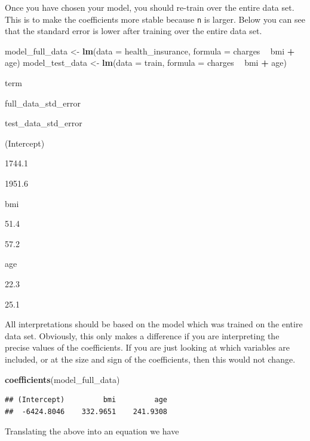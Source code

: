 \documentclass[]{book}
\newenvironment{Shaded}{\begin{snugshade}}{\end{snugshade}}
\newcommand{\DataTypeTok}[1]{\textcolor[rgb]{0.13,0.29,0.53}{#1}}
\newcommand{\KeywordTok}[1]{\textcolor[rgb]{0.13,0.29,0.53}{\textbf{#1}}}
\newcommand{\NormalTok}[1]{#1}
\newcommand{\OperatorTok}[1]{\textcolor[rgb]{0.81,0.36,0.00}{\textbf{#1}}}
\newcommand{\StringTok}[1]{\textcolor[rgb]{0.31,0.60,0.02}{#1}}
\begin{document}
Once you have chosen your model, you should re-train over the entire data set. This is to make the coefficients more stable because \texttt{n} is larger. Below you can see that the standard error is lower after training over the entire data set.

\begin{Shaded}
\begin{Highlighting}[]
\NormalTok{model_full_data <-}\StringTok{ }\KeywordTok{lm}\NormalTok{(}\DataTypeTok{data =}\NormalTok{ health_insurance, }\DataTypeTok{formula =}\NormalTok{ charges }\OperatorTok{~}\StringTok{ }\NormalTok{bmi }\OperatorTok{+}\StringTok{ }\NormalTok{age)}
\NormalTok{model_test_data <-}\StringTok{  }\KeywordTok{lm}\NormalTok{(}\DataTypeTok{data =}\NormalTok{ train, }\DataTypeTok{formula =}\NormalTok{ charges }\OperatorTok{~}\StringTok{ }\NormalTok{bmi }\OperatorTok{+}\StringTok{ }\NormalTok{age)}
\end{Highlighting}
\end{Shaded}

term

full\_data\_std\_error

test\_data\_std\_error

(Intercept)

1744.1

1951.6

bmi

51.4

57.2

age

22.3

25.1

All interpretations should be based on the model which was trained on the entire data set. Obviously, this only makes a difference if you are interpreting the precise values of the coefficients. If you are just looking at which variables are included, or at the size and sign of the coefficients, then this would not change.

\begin{Shaded}
\begin{Highlighting}[]
\KeywordTok{coefficients}\NormalTok{(model_full_data)}
\end{Highlighting}
\end{Shaded}

\begin{verbatim}
## (Intercept)         bmi         age 
##  -6424.8046    332.9651    241.9308
\end{verbatim}

Translating the above into an equation we have
\end{document}
